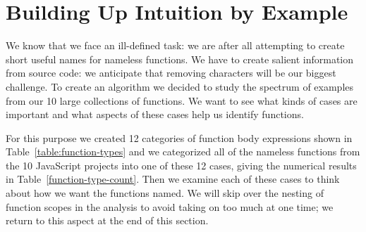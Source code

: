 \documentclass[10pt, preprint]{sigplanconf}
\begin{document}
\section{Building Up Intuition by Example}
\label{sec:intuition}
We know that we face an ill-defined task: we are after all attempting to create short useful names for nameless functions. We have to create salient information from source code: we anticipate that removing characters will be our biggest challenge.  To create an algorithm we decided to study the spectrum of examples from our 10 large collections of functions. We want to see what kinds of cases are important and what aspects of these cases help us identify functions.

For this purpose we created 12 categories of function body expressions shown in Table~\ref{table:function-types} and we categorized all of the nameless functions from the 10 JavaScript projects into one of these 12 cases, giving the numerical results in Table~\ref{function-type-count}.  Then we examine each of these cases to think about how we want the functions named. We will skip over the nesting of function scopes in the analysis to avoid taking on too much at one time; we return to this aspect at the end of this section.
\end{document}
